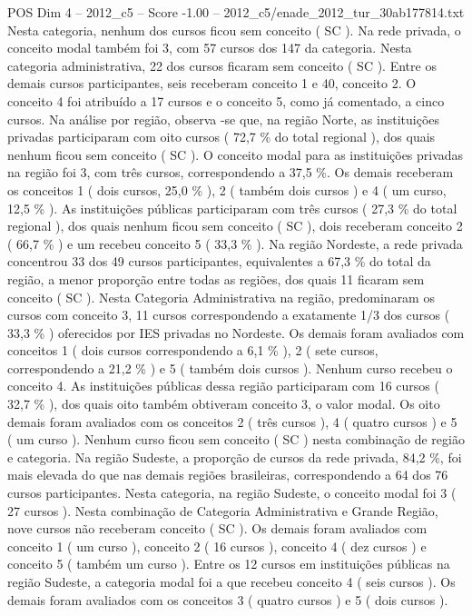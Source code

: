 \begin{textsample}{POS Dim 4 – 2012\_c5 – Score -1.00 – 2012\_c5/enade\_2012\_tur\_30ab177814.txt}
Nesta categoria, nenhum dos cursos ficou sem conceito ( SC ).
Na rede privada, o conceito modal também foi 3, com 57 cursos dos 147 da categoria.
Nesta categoria administrativa, 22 dos cursos ficaram sem conceito ( SC ).
Entre os demais cursos participantes, seis receberam conceito 1 e 40, conceito 2.
O conceito 4 foi atribuído a 17 cursos e o conceito 5, como já comentado, a cinco cursos.
Na análise por região, observa -se que, na região Norte, as instituições privadas participaram com oito cursos ( 72,7 \% do total regional ), dos quais nenhum ficou sem conceito ( SC ).
O conceito modal para as instituições privadas na região foi 3, com três cursos, correspondendo a 37,5 \%.
Os demais receberam os conceitos 1 ( dois cursos, 25,0 \% ), 2 ( também dois cursos ) e 4 ( um curso, 12,5 \% ).
As instituições públicas participaram com três cursos ( 27,3 \% do total regional ), dos quais nenhum ficou sem conceito ( SC ), dois receberam conceito 2 ( 66,7 \% ) e um recebeu conceito 5 ( 33,3 \% ).
Na região Nordeste, a rede privada concentrou 33 dos 49 cursos participantes, equivalentes a 67,3 \% do total da região, a menor proporção entre todas as regiões, dos quais 11 ficaram sem conceito ( SC ).
Nesta Categoria Administrativa na região, predominaram os cursos com conceito 3, 11 cursos correspondendo a exatamente 1/3 dos cursos ( 33,3 \% ) oferecidos por IES privadas no Nordeste.
Os demais foram avaliados com conceitos 1 ( dois cursos correspondendo a 6,1 \% ), 2 ( sete cursos, correspondendo a 21,2 \% ) e 5 ( também dois cursos ).
Nenhum curso recebeu o conceito 4.
As instituições públicas dessa região participaram com 16 cursos ( 32,7 \% ), dos quais oito também obtiveram conceito 3, o valor modal.
Os oito demais foram avaliados com os conceitos 2 ( três cursos ), 4 ( quatro cursos ) e 5 ( um curso ).
Nenhum curso ficou sem conceito ( SC ) nesta combinação de região e categoria.
Na região Sudeste, a proporção de cursos da rede privada, 84,2 \%, foi mais elevada do que nas demais regiões brasileiras, correspondendo a 64 dos 76 cursos participantes.
Nesta categoria, na região Sudeste, o conceito modal foi 3 ( 27 cursos ).
Nesta combinação de Categoria Administrativa e Grande Região, nove cursos não receberam conceito ( SC ).
Os demais foram avaliados com conceito 1 ( um curso ), conceito 2 ( 16 cursos ), conceito 4 ( dez cursos ) e conceito 5 ( também um curso ).
Entre os 12 cursos em instituições públicas na região Sudeste, a categoria modal foi a que recebeu conceito 4 ( seis cursos ).
Os demais foram avaliados com os conceitos 3 ( quatro cursos ) e 5 ( dois cursos ).

\end{textsample}
